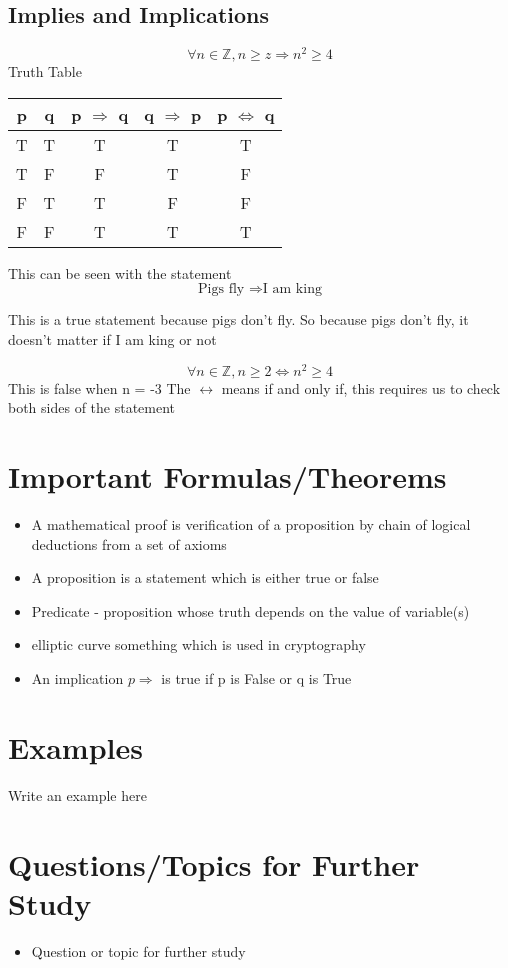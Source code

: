 \documentclass[12pt,a4paper]{article}
\begin{document}
\subsection{Implies and Implications}
\begin{equation}
  \forall n \in \mathbb{Z}, n \geq z \Rightarrow n^2 \geq 4 
\end{equation}
Truth Table
\begin{tabular}{c|c|c|c|c}
  p & q & p \( \Rightarrow \) q & q \( \Rightarrow \) p & p \( \Leftrightarrow \) q\\
  \hline
  T & T & T & T & T\\ 
  T & F & F & T & F\\ 
  F & T & T & F & F \\ 
  F & F & T & T & T 
\end{tabular}

This can be seen with the statement 
\begin{equation}
  \text{Pigs fly } \Rightarrow \text{I am king}
\end{equation}

This is a true statement because pigs don't fly. So because pigs don't fly, it doesn't matter if I am king or not

\begin{equation}
  \forall n \in \mathbb{Z}, n \geq 2 \Leftrightarrow n^2 \geq 4 
\end{equation}
This is false when n = -3 
The \( \leftrightarrow \) means if and only if, this requires us to check both sides of the statement

\section{Important Formulas/Theorems}
\begin{tcolorbox}[colback=blue!5!white,colframe=blue!75!black,title=Key Formula/Theorem]
  \begin{itemize}
    \item A mathematical proof is verification of a proposition by chain of logical deductions from a set of axioms
    \item A proposition is a statement which is either true or false 
    \item Predicate - proposition whose truth depends on the value of variable(s)
    \item elliptic curve something which is used in cryptography
    \item An implication \( p \Rightarrow \) is true if p is False or q is True 

  \end{itemize}
\end{tcolorbox}

\section{Examples}
\begin{tcolorbox}
  Write an example here
\end{tcolorbox}

\section{Questions/Topics for Further Study}
\begin{itemize}
  \item Question or topic for further study
\end{itemize}
\end{document}
